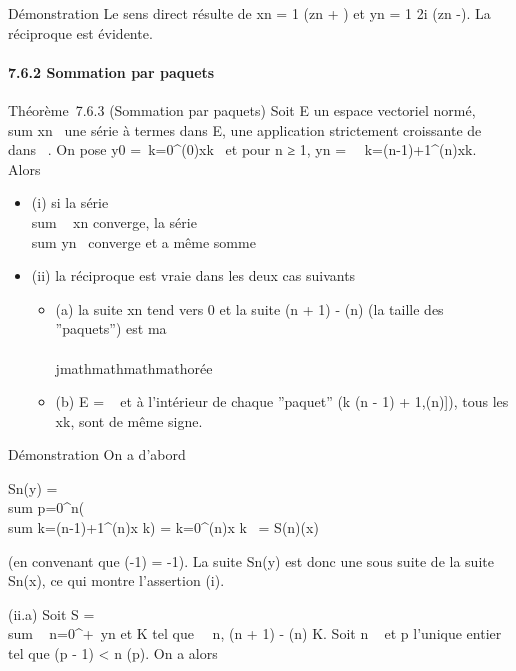 Démonstration Le sens direct résulte de xn = 1
 (zn +
\overlinezn) et yn = 1
\over 2i (zn
-\overlinezn). La réciproque est évidente.

\paragraph{7.6.2 Sommation par paquets}

Théorème~7.6.3 (Sommation par paquets) Soit E un espace vectoriel normé,
\\sum  xn~ une
série à termes dans E, \phi une application strictement croissante de ~
dans ~. On pose y0 =\
\sum  k=0^\phi(0)xk~ et
pour n ≥ 1, yn =\
\sum ~
k=\phi(n-1)+1^\phi(n)xk. Alors

\begin{itemize}
\itemsep1pt\parskip0pt
\item
  (i) si la série \\sum ~
  xn converge, la série
  \\sum  yn~
  converge et a même somme
\item
  (ii) la réciproque est vraie dans les deux cas suivants

  \begin{itemize}
  \itemsep1pt\parskip0pt
  \item
    (a) la suite xn tend vers 0 et la suite \phi(n + 1) - \phi(n)
    (la taille des ''paquets'') est ma\\\\jmathmathmathmathorée
  \item
    (b) E = \mathbb{R}~ et à l'intérieur de chaque ''paquet'' (k \in {[}\phi(n - 1) +
    1,\phi(n){]}), tous les xk, sont de même signe.
  \end{itemize}
\end{itemize}

Démonstration On a d'abord

Sn(y) = \\sum
p=0^n(\\sum
k=\phi(n-1)+1^\phi(n)x k) =
\sum k=0^\phi(n)x k~ =
S\phi(n)(x)

(en convenant que \phi(-1) = -1). La suite Sn(y) est donc une
sous suite de la suite Sn(x), ce qui montre l'assertion (i).

(ii.a) Soit S = \\sum ~
n=0^+\infty~yn et K tel que
\forall~~n, \phi(n + 1) - \phi(n) \leq K. Soit n \in {}~ et p
l'unique entier tel que \phi(p - 1) \textless{} n \leq \phi(p). On a alors

